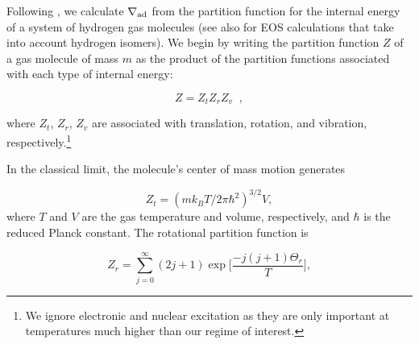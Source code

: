 Following \citet{kittel}, we calculate $\nabla_{\rm ad}$ from the partition function for the internal energy of a system of hydrogen gas molecules (see also \citealt{dangelo13} for EOS calculations that take into account hydrogen isomers).  We begin by writing the partition function $Z$ of a gas molecule of mass $m$ as the product of the partition functions associated with each type of internal energy:


\begin{equation}
\label{eq:zagain}
Z=Z_t Z_r Z_v \;\;,
\end{equation} 

\noindent where $Z_t$, $Z_r$, $Z_v$ are associated with translation, rotation, and vibration, respectively.\footnote{We ignore electronic and nuclear excitation as they are only important at temperatures much higher than our regime of interest.}  %


In the classical limit, the molecule's center of mass motion generates

\begin{equation}
\label{eq:Zt}
Z_t=(m k_B T/2 \pi \hbar^2)^{3/2} V,
\end{equation}
where  $T$ and $V$ are the gas temperature and volume, respectively, and $\hbar$ is the reduced Planck constant. The rotational partition function is

\begin{equation}
\label{eq:Zr}
Z_r=\sum_{j=0}^\infty (2 j+1) \exp{\Big[\frac{-j (j+1)\Theta_r}{T}\Big]},
\end{equation}

